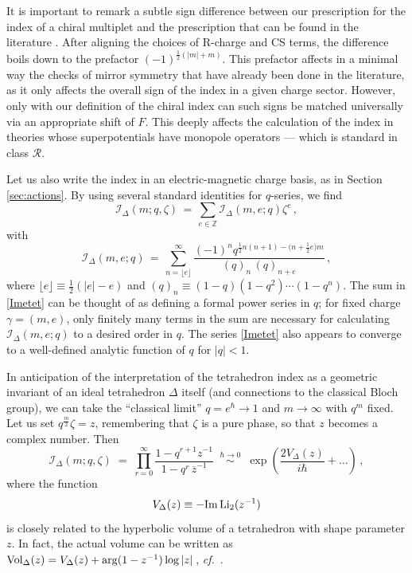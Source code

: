 \documentclass[11pt,letterpaper]{article}
\numberwithin{equation}{section}
\newcommand{\be}{\begin{equation}}
\newcommand{\ee}{\end{equation}}
\newcommand{\ol}{\overline}
\newcommand{\cf}{\emph{cf.}}
\newcommand{\Z}{{\mathbb Z}}
\newcommand{\Li}{{\rm Li}}
\renewcommand{\Im}{{\rm Im}}
\newcommand{\CI}{\mathcal{I}}
\newcommand{\CR}{\mathcal{R}}
\begin{document}
It is important to remark a subtle sign difference between our prescription for the index of a chiral multiplet and the prescription that can be found in the literature \cite{IY-index,KW-index}.
After aligning the choices of R-charge and CS terms, the difference boils down to the prefactor $(-1)^{\frac12(|m|+m)}$.
This prefactor affects in a minimal way the checks of mirror symmetry that have already been done in the literature, as it only affects the overall sign of the index in a given charge sector. However, only with our definition of the chiral index can such signs be matched universally via an appropriate shift of $F$. This deeply affects the calculation of the index in theories whose superpotentials have monopole operators --- which is standard in class $\CR$.


Let us also write the index in an electric-magnetic charge basis, as in Section \ref{sec:actions}. By using several standard identities for $q$-series, we find
%
\be \CI_\Delta(m;q,\zeta) \,=\, \sum_{e\in \Z} \CI_\Delta(m,e;q)\zeta^e\,,\ee
%
with
%
\be \CI_\Delta(m,e;q) \,=\, \sum_{n=\lfloor e\rfloor}^\infty
 \frac{(-1)^n q^{\frac12 n(n+1)-\big( n+\frac 12e\big) m}}{(q)_n\,(q)_{n+e}}\,, \label{Imetet}\ee
%
where $\lfloor e \rfloor \equiv \tfrac12(|e|-e)$ and $(q)_n \equiv (1-q)(1-q^2)\cdots (1-q^n)$. The sum in \eqref{Imetet} can be thought of as defining a formal power series in $q$; for fixed charge $\gamma=(m,e)$, only finitely many terms in the sum are necessary for calculating $\CI_\Delta(m,e;q)$ to a desired order in $q$. The series \eqref{Imetet} also appears to converge to a well-defined analytic function of $q$ for $|q|<1$.



In anticipation of the interpretation of the tetrahedron index as a geometric invariant of an ideal tetrahedron $\Delta$ itself (and connections to the classical Bloch group), we can take the ``classical limit'' $q =e^\hbar \to 1$ and $m\to \infty$ with $q^m$ fixed. Let us set $q^{\frac m2}\zeta=z$, remembering that $\zeta$ is a pure phase, so that $z$ becomes a complex number. Then
%
\be \label{tetasymp}
\CI_\Delta(m;q,\zeta) \;=\; \prod_{r=0}^\infty \frac{1-q^{r+1}z^{-1}}{1-q^r \,\ol z^{-1}}\;\;\overset{\hbar\to 0}{\sim}\;\; \exp\left( \frac{2V_\Delta(z)}{i\hbar}+\ldots\right)\,,
\ee
%
where the function
%
\be V_\Delta(z) \equiv -\Im\,\Li_2(z^{-1}) \ee
%
is closely related to the hyperbolic volume of a tetrahedron with shape parameter $z$. In fact, the actual volume can be written as ${\rm Vol}_\Delta(z) = V_\Delta(z) + \arg(1-z^{-1})\log|z|$\,, \cf\ \cite{Thurston-1980}.
\end{document}
